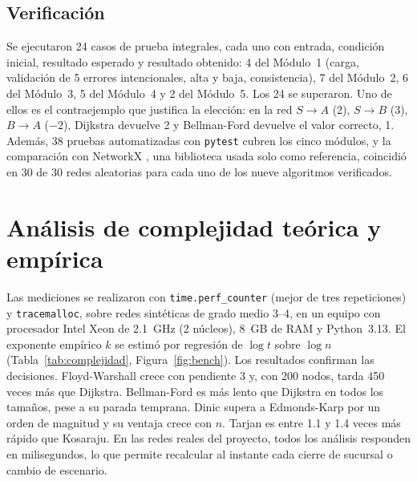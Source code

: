 \documentclass[11pt,a4paper]{article}
\newcommand{\id}[1]{\texttt{#1}}
\begin{document}
\subsection{Verificación}
Se ejecutaron 24 casos de prueba integrales, cada uno con entrada, condición inicial, resultado esperado y resultado
obtenido: 4 del Módulo~1 (carga, validación de 5 errores intencionales, alta y baja, consistencia), 7 del Módulo~2,
6 del Módulo~3, 5 del Módulo~4 y 2 del Módulo~5. Los 24 se superaron. Uno de ellos es el contraejemplo que justifica
la elección: en la red $S\!\to\!A$ (2), $S\!\to\!B$ (3), $B\!\to\!A$ ($-2$), Dijkstra devuelve 2 y Bellman-Ford
devuelve el valor correcto, 1. Además, 38 pruebas automatizadas con \id{pytest} cubren los cinco módulos, y la
comparación con NetworkX \citep{hagberg2008}, una biblioteca usada solo como referencia, coincidió en 30 de 30 redes
aleatorias para cada uno de los nueve algoritmos verificados.

\section{Análisis de complejidad teórica y empírica}

Las mediciones se realizaron con \id{time.perf\_counter} (mejor de tres repeticiones) y \id{tracemalloc}, sobre
redes sintéticas de grado medio 3–4, en un equipo con procesador Intel Xeon de 2.1~GHz (2 núcleos), 8~GB de RAM y
Python~3.13. El exponente empírico $k$ se estimó por regresión de $\log t$ sobre $\log n$
(Tabla~\ref{tab:complejidad}, Figura~\ref{fig:bench}).
Los resultados confirman las decisiones. Floyd-Warshall crece con pendiente 3 y, con 200 nodos, tarda 450 veces más
que Dijkstra. Bellman-Ford es más lento que Dijkstra en todos los tamaños, pese a su parada temprana. Dinic supera a
Edmonds-Karp por un orden de magnitud y su ventaja crece con $n$. Tarjan es entre 1.1 y 1.4 veces más rápido que
Kosaraju. En las redes reales del proyecto, todos los análisis responden en milisegundos, lo que permite recalcular
al instante cada cierre de sucursal o cambio de escenario.
\end{document}
